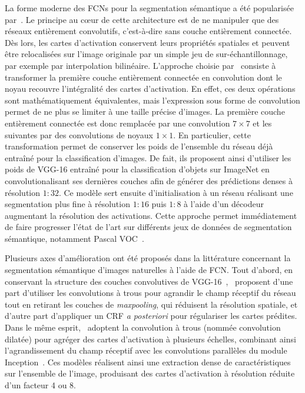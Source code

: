 La forme moderne des \glspl{FCN} pour la segmentation sémantique a été popularisée par~\citet{long_fully_2015}. Le principe au c\oe{}ur de cette architecture est de ne manipuler que des réseaux entièrement convolutifs, c'est-à-dire sans couche entièrement connectée. Dès lors, les cartes d'activation conservent leurs propriétés spatiales et peuvent être relocalisées sur l'image originale par un simple jeu de sur-échantillonnage, par exemple par interpolation bilinéaire. L'approche choisie par~\citet{long_fully_2015} consiste à transformer la première couche entièrement connectée en convolution dont le noyau recouvre l'intégralité des cartes d'activation. En effet, ces deux opérations sont mathématiquement équivalentes, mais l'expression sous forme de convolution permet de ne plus se limiter à une taille précise d'images. La première couche entièrement connectée est donc remplacée par une convolution $7\times7$ et les suivantes par des convolutions de noyaux $1\times1$. En particulier, cette transformation permet de conserver les poids de l'ensemble du réseau déjà entraîné pour la classification d'images. De fait, ils proposent ainsi d'utiliser les poids de VGG-16 entraîné pour la classification d'objets sur ImageNet en convolutionalisant ses dernières couches afin de générer des prédictions denses à résolution $1:32$. Ce modèle sert ensuite d'initialisation à un réseau réalisant une segmentation plus fine à résolution $1:16$ puis $1:8$ à l'aide d'un décodeur augmentant la résolution des activations. Cette approche permet immédiatement de faire progresser l'état de l'art sur différents jeux de données de segmentation sémantique, notamment Pascal VOC~\cite{everingham_pascal_2014}.

Plusieurs axes d'amélioration ont été proposés dans la littérature concernant la segmentation sémantique d'images naturelles à l'aide de \gls{FCN}. Tout d'abord, en conservant la structure des couches convolutives de VGG-16~\cite{simonyan_very_2014},~\citet{l._c._chen_deeplab_2018} proposent d'une part d'utiliser les convolutions à trous pour agrandir le champ réceptif du réseau tout en retirant les couches de \emph{maxpooling}, qui réduisent la résolution spatiale, et d'autre part d'appliquer un \gls{CRF} \emph{a posteriori} pour régulariser les cartes prédites. Dans le même esprit,~\citet{yu_multi-scale_2015} adoptent la convolution à trous (nommée convolution dilatée) pour agréger des cartes d'activation à plusieurs échelles, combinant ainsi l'agrandissement du champ réceptif avec les convolutions parallèles du module Inception~\cite{szegedy_going_2015}. Ces modèles réalisent ainsi une extraction dense de caractéristiques sur l'ensemble de l'image, produisant des cartes d'activation à résolution réduite d'un facteur 4 ou 8.

